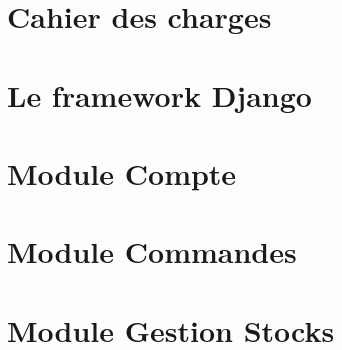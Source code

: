 \documentclass[twoside,UTF8]{EPURapport}
\begin{document}
\chapter{Cahier des charges}

\chapter{Le framework Django}

\chapter{Module Compte}

\chapter{Module Commandes}

\chapter{Module Gestion Stocks}
\end{document}
